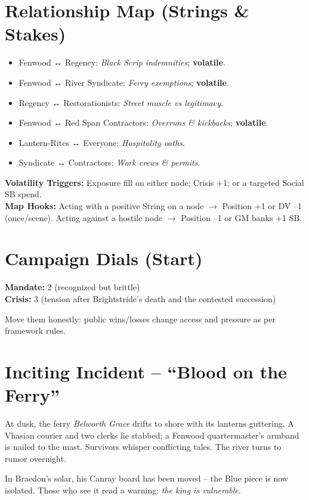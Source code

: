 \documentclass[11pt]{article}
\begin{document}
\section*{Relationship Map (Strings \& Stakes)}
\begin{itemize}
  \item Fenwood ↔ Regency: \textit{Black Scrip indemnities}; \textbf{volatile}.
  \item Fenwood ↔ River Syndicate: \textit{Ferry exemptions}; \textbf{volatile}.
  \item Regency ↔ Restorationists: \textit{Street muscle vs legitimacy}.
  \item Fenwood ↔ Red Span Contractors: \textit{Overruns \& kickbacks}; \textbf{volatile}.
  \item Lantern-Rites ↔ Everyone: \textit{Hospitality oaths}.
  \item Syndicate ↔ Contractors: \textit{Work crews \& permits}.
\end{itemize}
\textbf{Volatility Triggers:} Exposure fill on either node; Crisis +1; or a targeted Social SB spend. \\
\textbf{Map Hooks:} Acting with a positive String on a node $\rightarrow$ Position +1 or DV --1 (once/scene). Acting against a hostile node $\rightarrow$ Position --1 or GM banks +1 SB.

\section*{Campaign Dials (Start)}
\textbf{Mandate:} 2 (recognized but brittle) \\
\textbf{Crisis:} 3 (tension after Brightstride's death and the contested succession)

Move them honestly: public wins/losses change access and pressure as per framework rules.

\section*{Inciting Incident -- ``Blood on the Ferry''}
At dusk, the ferry \textit{Belworth Grace} drifts to shore with its lanterns guttering. A Vhasian courier and two clerks lie stabbed; a Fenwood quartermaster's armband is nailed to the mast. Survivors whisper conflicting tales. The river turns to rumor overnight.

In Braedon's solar, his Canray board has been moved -- the Blue piece is now isolated. Those who see it read a warning: \textit{the king is vulnerable}.
\end{document}
